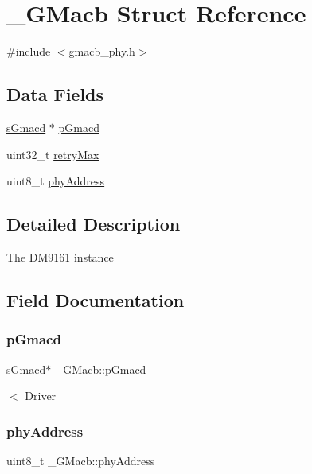 \hypertarget{struct__GMacb}{}\section{\+\_\+\+G\+Macb Struct Reference}
\label{struct__GMacb}


{\ttfamily \#include $<$gmacb\+\_\+phy.\+h$>$}

\subsection*{Data Fields}
\begin{DoxyCompactItemize}
\item 
\mbox{\hyperlink{group__gmacd__types_gaa8760917079000a5ee7fbc7fab992dd3}{s\+Gmacd}} $\ast$ \mbox{\hyperlink{struct__GMacb_a600ae431b9a6c328f39bfcc35230beee}{p\+Gmacd}}
\item 
uint32\+\_\+t \mbox{\hyperlink{struct__GMacb_abc231a110ba755f5b292729ddf545fcf}{retry\+Max}}
\item 
uint8\+\_\+t \mbox{\hyperlink{struct__GMacb_a83109d9982265cbb7428b67a86b5ad04}{phy\+Address}}
\end{DoxyCompactItemize}


\subsection{Detailed Description}
The D\+M9161 instance 

\subsection{Field Documentation}
\mbox{\label{struct__GMacb_a600ae431b9a6c328f39bfcc35230beee}} 
\subsubsection{\texorpdfstring{pGmacd}{pGmacd}}
{\footnotesize\ttfamily \mbox{\hyperlink{group__gmacd__types_gaa8760917079000a5ee7fbc7fab992dd3}{s\+Gmacd}}$\ast$ \+\_\+\+G\+Macb\+::p\+Gmacd}

$<$ Driver \mbox{\label{struct__GMacb_a83109d9982265cbb7428b67a86b5ad04}} 
\subsubsection{\texorpdfstring{phyAddress}{phyAddress}}
{\footnotesize\ttfamily uint8\+\_\+t \+\_\+\+G\+Macb\+::phy\+Address}

